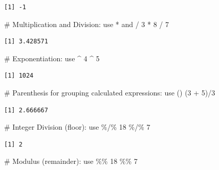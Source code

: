 \documentclass[
  letterpaper,
  DIV=11,
  numbers=noendperiod]{scrreprt}
\newenvironment{Shaded}{\begin{snugshade}}{\end{snugshade}}
\newcommand{\CommentTok}[1]{\textcolor[rgb]{0.37,0.37,0.37}{#1}}
\newcommand{\DecValTok}[1]{\textcolor[rgb]{0.68,0.00,0.00}{#1}}
\newcommand{\NormalTok}[1]{\textcolor[rgb]{0.00,0.23,0.31}{#1}}
\newcommand{\SpecialCharTok}[1]{\textcolor[rgb]{0.37,0.37,0.37}{#1}}
\begin{document}
\begin{verbatim}
[1] -1
\end{verbatim}

\begin{Shaded}
\begin{Highlighting}[]
\CommentTok{\# Multiplication and Division: use * and /}
\DecValTok{3} \SpecialCharTok{*} \DecValTok{8} \SpecialCharTok{/} \DecValTok{7}
\end{Highlighting}
\end{Shaded}

\begin{verbatim}
[1] 3.428571
\end{verbatim}

\begin{Shaded}
\begin{Highlighting}[]
\CommentTok{\# Exponentiation: use \^{}}
\DecValTok{4} \SpecialCharTok{\^{}} \DecValTok{5}
\end{Highlighting}
\end{Shaded}

\begin{verbatim}
[1] 1024
\end{verbatim}

\begin{Shaded}
\begin{Highlighting}[]
\CommentTok{\# Parenthesis for grouping calculated expressions: use ()}
\NormalTok{(}\DecValTok{3} \SpecialCharTok{+} \DecValTok{5}\NormalTok{)}\SpecialCharTok{/}\DecValTok{3}
\end{Highlighting}
\end{Shaded}

\begin{verbatim}
[1] 2.666667
\end{verbatim}

\begin{Shaded}
\begin{Highlighting}[]
\CommentTok{\# Integer Division (floor): use \%/\%}
\DecValTok{18} \SpecialCharTok{\%/\%} \DecValTok{7}
\end{Highlighting}
\end{Shaded}

\begin{verbatim}
[1] 2
\end{verbatim}

\begin{Shaded}
\begin{Highlighting}[]
\CommentTok{\# Modulus (remainder): use \%\%}
\DecValTok{18} \SpecialCharTok{\%\%} \DecValTok{7}
\end{Highlighting}
\end{Shaded}
\end{document}
